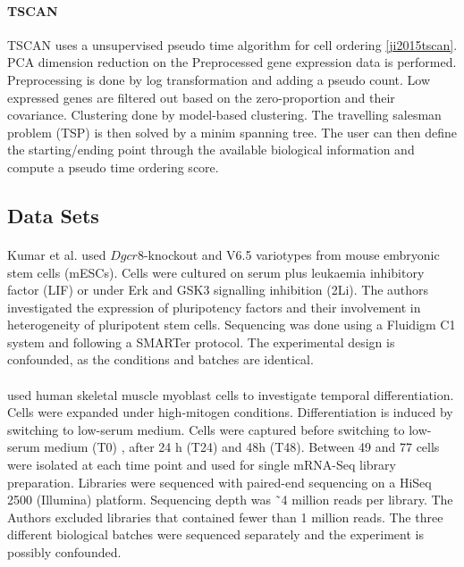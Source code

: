 \documentclass[11pt, a4paper]{article}\usepackage[]{graphicx}\usepackage[]{color}
\begin{document}
\paragraph{TSCAN}
TSCAN uses a unsupervised pseudo time algorithm for cell ordering \ref{ji2015tscan}. PCA dimension reduction on the Preprocessed gene expression data is performed. Preprocessing is done by log transformation and adding a pseudo count. Low expressed genes are filtered out based on the zero-proportion and their covariance. Clustering done by model-based clustering. 
The travelling salesman problem (TSP) is then solved by a minim spanning tree. The user can then define the starting/ending point through the available biological information and compute a pseudo time ordering score. 



\subsection{Data Sets}

\paragraph{\citet{kumar2014deconstructing}} 
Kumar et al. used $Dgcr8$-knockout and V6.5 variotypes from mouse embryonic stem cells (mESCs). Cells were cultured on serum plus leukaemia inhibitory factor (LIF) or under Erk and GSK3 signalling inhibition (2Li). The authors investigated the expression of pluripotency factors and their involvement in heterogeneity of pluripotent stem cells. Sequencing was done using a Fluidigm C1 system and following a SMARTer protocol.  The experimental design is confounded, as the conditions and batches are identical.

\paragraph{\citet{trapnell2014dynamics}} 
\citet{trapnell2014dynamics} used human skeletal muscle myoblast cells to investigate temporal differentiation. Cells were expanded under high-mitogen conditions. Differentiation is induced by switching to low-serum medium. Cells were captured before switching to low-serum medium (T0) , after 24 h (T24) and 48h (T48). Between 49 and 77 cells were isolated at each time point and used for single mRNA-Seq library preparation. Libraries were sequenced with paired-end sequencing on a HiSeq 2500 (Illumina) platform. Sequencing depth was ˜4 million reads per library. 
The Authors excluded libraries that contained fewer than 1 million reads. The three different biological batches were sequenced separately and the experiment is possibly confounded.
\end{document}
